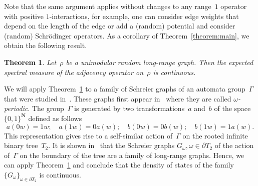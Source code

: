 \documentclass[english]{article}
\newtheorem{theorem}[lemma]{Theorem}
\theoremstyle{definition}
\newcommand*{\field}[1]{\mathbf{#1}} %
\newcommand*\N{\field{N}} %
\begin{document}
Note that the same argument applies without changes to any range~$1$ operator with positive $1$-interactions, for example, one can consider edge weights that depend on the length of the edge or add a (random) potential and consider (random) Schrödinger operators.  As a corollary of Theorem~\ref{theorem:main}, we obtain the following result.

\begin{theorem}\label{theorem:long-range}
    Let~$\rho$ be a unimodular random long-range graph. Then the expected spectral measure of the adjacency operator on~$\rho$ is continuous. 
\end{theorem}


We will apply Theorem~\ref{theorem:long-range} to a family of Schreier graphs of an automata group~$\Gamma$ that were studied in~\cite{BCDN}. These graphs first appear in~\cite{BH} where they are called \emph{$\omega$-periodic}. The group~$\Gamma$ is generated by two transformations~$a$ and~$b$ of the space $\{0,1\}^\N$ defined as follows 
\begin{equation}
    a(0w) = 1w;  \quad a(1w) = 0a(w); \quad b(0w) = 0b(w); \quad b(1w) = 1a(w).
\end{equation}
This representation gives rise to a self-similar action of~$\Gamma$ on the rooted infinite binary tree~$T_2$. It is shown in~\cite{BCDN} that the Schreier graphs $G_\omega, \omega\in \partial T_2$ of the action of~$\Gamma$ on the boundary of the tree are a family of long-range graphs. Hence, we can apply Theorem~\ref{theorem:long-range} and conclude that the density of states of the family $\{G_\omega\}_{\omega\in  \partial T_2}$ is continuous. 
\end{document}
